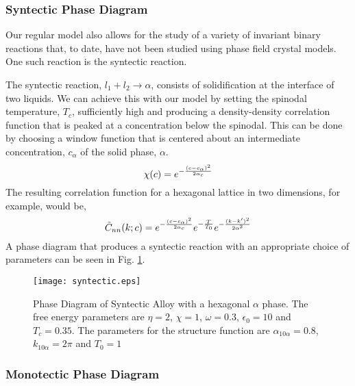 \subsubsection{Syntectic Phase Diagram} %

Our regular model also allows for the study of a variety of invariant binary
reactions that, to date, have not been studied using phase field crystal
models. One such reaction is the syntectic reaction. 

The syntectic reaction, $l_1 + l_2 \rightarrow \alpha $, consists of
solidification at the interface of two liquids. We can achieve this with our
model by setting the spinodal temperature, $T_c$, sufficiently high and
producing a density-density correlation function that is peaked at a
concentration below the spinodal. This can be done by choosing a window
function that is centered about an intermediate concentration, $c_\alpha$ of
the solid phase, $\alpha$. 
%
\begin{equation}
  \chi(c) = e^{- \frac{(c - c_\alpha)^2}{2 \alpha_c}}
\end{equation}
%
The resulting correlation function for a hexagonal lattice in two dimensions,
for example, would be,
%
\begin{equation}
  \tilde{C}_{nn}(k; c) = 
    e^{-\frac{(c - c_\alpha)^2}{2 \alpha_c}}
    e^{-\frac{T}{T_0}} 
    e^{-\frac{(k - k^\prime)^2}{2\alpha^2}}
\end{equation}
%
A phase diagram that produces a syntectic reaction with an appropriate choice
of parameters can be seen in Fig. \ref{syntectic}.

\begin{figure}
    \centering
	\texttt{[image: syntectic.eps]}
	\caption{
        \label{syntectic} Phase Diagram of Syntectic Alloy with a hexagonal
        $\alpha$ phase. The free energy parameters are $\eta=2$, $\chi=1$,
        $\omega=0.3$, $\epsilon_0 = 10$ and $T_c=0.35$. The parameters for the
        structure function are $\alpha_{10\alpha} = 0.8$, $k_{10\alpha} = 2\pi$
        and $T_0 = 1$
    }
\end{figure}

\subsubsection{Monotectic Phase Diagram} %

